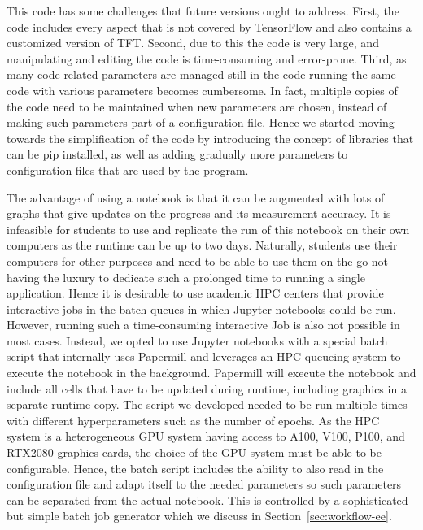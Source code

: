This code has some challenges that future versions ought to address. First, the code includes every aspect that is not covered by TensorFlow and also contains a customized version of TFT. Second, due to this the code is very large, and manipulating and editing the code is time-consuming and error-prone. 
Third, as many code-related parameters are managed still in the code running the same code with various parameters becomes cumbersome. In fact, multiple copies of the code need to be maintained when new parameters are chosen, instead of making such parameters part of a configuration file. Hence we started moving towards the simplification of the code by introducing the concept of libraries that can be pip installed, as well as adding gradually more parameters to configuration files that are used by the program.

The advantage of using a notebook is that it can be augmented with lots of graphs that give updates on the progress and its measurement accuracy. It is infeasible for students to use and replicate the run of this notebook on their own computers as the runtime can be up to two days. Naturally, students use their computers for other purposes and need to be able to use them on the go not having the luxury to dedicate such a prolonged time to running a single application. Hence it is desirable to use academic HPC centers that provide interactive jobs in the batch queues in which Jupyter notebooks could be run. However, running such a time-consuming interactive Job is also not possible in most cases. Instead, we opted to use Jupyter notebooks with a special batch script that internally uses Papermill \citep{www-papermill} and leverages an HPC queueing system to execute the notebook in the background. Papermill will execute the notebook and include all cells that have to be updated during runtime, including graphics in a separate runtime copy. The script we developed needed to be run multiple times with different hyperparameters such as the number of epochs.  As the HPC system is a heterogeneous GPU system having access to A100, V100, P100, and RTX2080 graphics cards, the choice of the GPU system must be able to be configurable. Hence, the batch script includes the ability to also read in the configuration file and adapt itself to the needed parameters so such parameters can be separated from the actual notebook. This is controlled by a sophisticated but simple batch job generator which we discuss in Section~\ref{sec:workflow-ee}.


